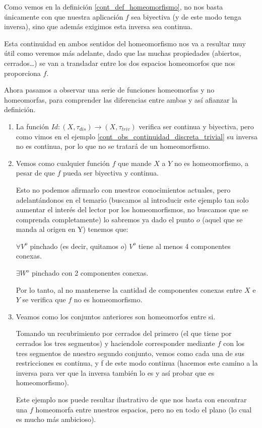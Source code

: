 \label{cont_obs_defHomeomorfismo}
\begin{obs}
	Como vemos en la definición \ref{cont_def_homeomorfismo}, no nos basta únicamente con que nuestra aplicación $f$ sea biyectiva (y de este modo tenga inversa), sino que además exigimos esta inversa sea continua. 
	
	Esta continuidad en ambos sentidos del homeomorfismo nos va a resultar muy útil como veremos más adelante, dado que las muchas propiedades (abiertos, cerrados\dots) se van a transladar entre los dos espacios homeomorfos que nos proporciona $f$.
\end{obs}

Ahora pasamos a observar una serie de funciones homeomorfas y no homeomorfas, para comprender las diferencias entre ambas y así afianzar la definición.
\label{etop_exa_homeomorfismos}
\begin{exa}[Homeomorfismos]
	
	\begin{enumerate}
		\item La función $Id\colon(X,\tau_{dis})\rightarrow(X,\tau_{triv})$ verifica ser continua y biyectiva, pero como vimos en el ejemplo \ref{cont_obs_continuidad_discreta_trivial} su inversa no es continua, por lo que no se tratará de un homeomorfismo. 
		
		\item %
		Vemos como cualquier función $f$ que mande $X$ a $Y$ no es homeomorfismo, a pesar de que $f$ pueda ser biyectiva y continua.
		
		Esto no podemos afirmarlo con nuestros conocimientos actuales, pero adelantándonos en el temario (buscamos al introducir este ejemplo tan solo aumentar el interés del lector por los homeomorfismos, no buscamos que se comprenda completamente) lo sabremos ya dado el punto $o$ (aquel que se manda al origen en Y) tenemos que:
		
		$\forall V^o$ pinchado (es decir, quitamos $o$) $V^o$ tiene al menos 4 componentes conexas.%
		
		$\exists W^o$ pinchado  con 2 componentes conexas.%
		
		Por lo tanto, al no mantenerse la cantidad de componentes conexas entre $X$ e $Y$ se verifica que $f$ no es homeomorfismo.
		
		\item %
		Veamos como los conjuntos anteriores son homeomorfos entre si.
		
		 Tomando un recubrimiento por cerrados del primero (el que tiene por cerrados los tres segmentos) y haciendole corresponder mediante $f$ con los tres segmentos de nuestro segundo conjunto, vemos como cada una de sus restricciones es continua, y f de este modo continua (hacemos este camino a la inversa para ver que la inversa también lo es y así probar que es homeomorfismo). 
		
		Este ejemplo nos puede resultar ilustrativo de que nos basta con encontrar una $f$ homeomorfa entre nuestros espacios, pero no en todo el plano (lo cual es mucho más ambicioso).
	\end{enumerate}
\end{exa}

